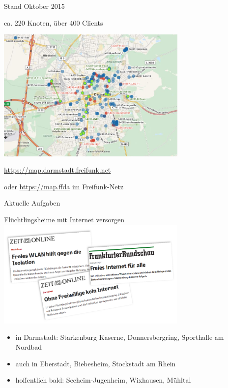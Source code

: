\documentclass[10pt]{beamer}
\begin{document}
\begin{frame}{Stand Oktober 2015}
	\begin{center}
		\vfill
		ca. 220 Knoten, über 400 Clients
		\begin{center}
			\includegraphics[width=0.7\textwidth]{images/2015-10-03_darmstadt-map}
		\end{center}
		
		\vfill
		\url{https://map.darmstadt.freifunk.net}
		
		\tiny oder \url{https://map.ffda} im Freifunk-Netz
	\end{center}	
\end{frame}

\begin{frame}{Aktuelle Aufgaben}
	\begin{center}
		\large Flüchtlingsheime mit Internet versorgen \\
		\includegraphics[width=0.7\textwidth]{images/2015-10_presse-fluechtlinge}
	\end{center}
	\begin{itemize}[<+->]
		\item in Darmstadt: Starkenburg Kaserne, Donnersbergring, Sporthalle am Nordbad
		\item auch in Eberstadt, Biebesheim, Stockstadt am Rhein
		\item hoffentlich bald: Seeheim-Jugenheim, Wixhausen, Mühltal
	\end{itemize}	
\end{frame}	
\end{document}
